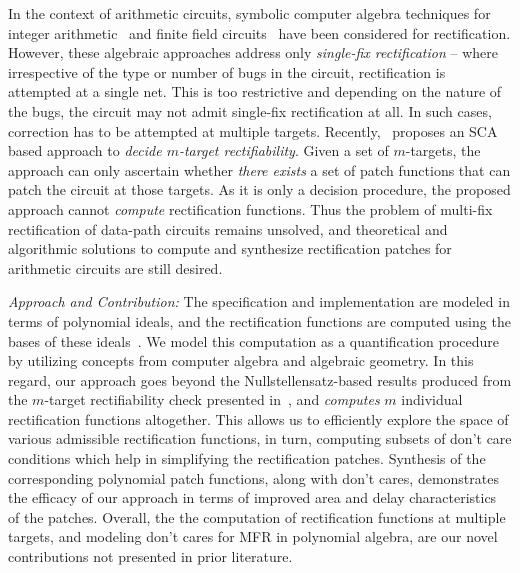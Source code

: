 In the context of arithmetic circuits, symbolic computer algebra 
techniques for integer arithmetic~\cite{farimah:2017:1,MF_Rolf:ISVLSI18} and
finite field circuits~\cite{Utkarsh:ETS19,Utkarsh:VLSI18,Vkrao:FMCAD18}
have been considered for rectification. However, these algebraic
approaches address only {\it single-fix rectification} -- where
irrespective of the type or number of bugs in the circuit,
rectification is attempted at a single net. This is too restrictive
and depending on the nature of the bugs, the circuit may not admit
single-fix rectification at all. In such cases, correction has to be
attempted at multiple targets.
Recently,~\cite{Vkrao:ISQED21} proposes an SCA based approach to 
{\it decide $m$-target rectifiability}. Given a set of $m$-targets,
the approach can only ascertain whether {\it there exists} a set of
patch functions that can patch the circuit at those targets. As 
it is only a decision procedure, the proposed approach cannot 
{\it compute} rectification functions.
Thus the problem of multi-fix rectification of data-path circuits
remains unsolved, and theoretical and algorithmic solutions to compute
and synthesize rectification patches for arithmetic circuits are still
desired. 

{\red 

}

{\it Approach and Contribution:}
The specification and implementation are modeled in terms of polynomial ideals, and
the rectification functions are computed using the \Grobner bases of these ideals~\cite{gb_book}.
We model this computation as a quantification procedure by utilizing
concepts from computer algebra and algebraic geometry. 
In this regard, our approach goes beyond
the Nullstellensatz-based results produced from the $m$-target
rectifiability check presented in~\cite{Vkrao:ISQED21}, and {\it computes}
$m$ individual rectification functions altogether. This allows us to
efficiently explore the space of various admissible rectification
functions, in turn, computing subsets of don't care conditions
which help in simplifying the rectification patches. Synthesis of the 
corresponding polynomial patch functions, along with don't cares,  
demonstrates the efficacy of our approach in terms of improved area 
and delay characteristics of the patches.
Overall, the  the computation of rectification functions at multiple
targets, and modeling don't cares for MFR in
polynomial algebra, are our novel contributions not presented
in prior literature. 

